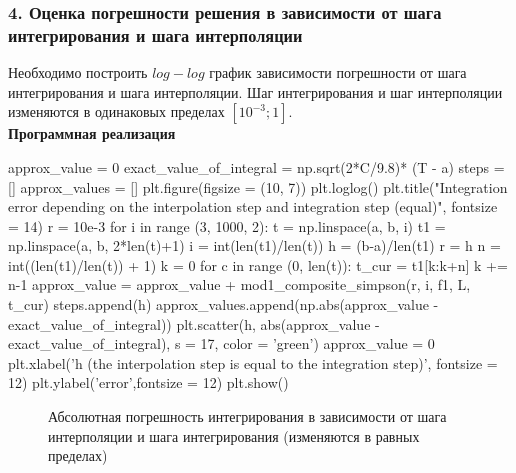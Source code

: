 \subsubsection{4. Оценка погрешности решения в зависимости от шага интегрирования и шага интерполяции}
Необходимо построить $log-log$ график зависимости погрешности от шага интегрирования и шага интерполяции. Шаг интегрирования и шаг интерполяции изменяются в одинаковых пределах $[10^{-3}; 1].$ \\
\textbf{Программная реализация}
\begin{python}
approx_value = 0
exact_value_of_integral = np.sqrt(2*C/9.8)* (T - a)
steps = []
approx_values = []
plt.figure(figsize = (10, 7))
plt.loglog()
plt.title("Integration error depending on the interpolation step and integration step (equal)", fontsize = 14)
r = 10e-3
for i in range (3, 1000, 2):
  t = np.linspace(a, b, i)
  t1 = np.linspace(a, b, 2*len(t)+1)
  i = int(len(t1)/len(t))
  h = (b-a)/len(t1)
  r = h
  n = int((len(t1)/len(t)) + 1)
  k = 0
  for c in range (0, len(t)):
    t_cur = t1[k:k+n]
    k += n-1
    approx_value = approx_value + mod1_composite_simpson(r, i, f1, L, t_cur)
  steps.append(h)
  approx_values.append(np.abs(approx_value - exact_value_of_integral))
  plt.scatter(h, abs(approx_value - exact_value_of_integral), s = 17, color = 'green')
  approx_value = 0
plt.xlabel('h (the interpolation step is equal to the integration step)', fontsize = 12)
plt.ylabel('error',fontsize = 12)
plt.show()
\end{python}
\begin{figure}[h]
\caption{Абсолютная погрешность интегрирования в зависимости от шага интерполяции и шага интегрирования (изменяются в равных пределах)}
\end{figure}
